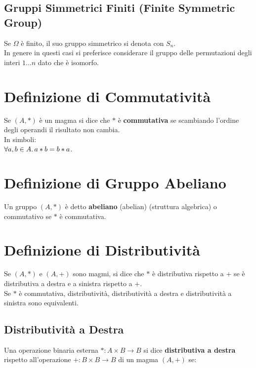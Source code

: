 \documentclass[a4paper, twoside, italian, 11pt]{book}
\begin{document}
\subsection{Gruppi Simmetrici Finiti (Finite Symmetric Group)}

Se $\Omega$ è finito, il suo gruppo simmetrico si denota con $S_n$. \\
In genere in questi casi si preferisce considerare il gruppo delle permutazioni degli interi $1...n$ dato che è isomorfo.



\section{Definizione di Commutatività}

Se $(A, *)$ è un magma si dice che $*$ è \textbf{commutativa} se scambiando l'ordine degli operandi il risultato non cambia. \\

\noindent
In simboli: \\

$\forall a,b \in A \ldotp a * b = b * a$.



\section{Definizione di Gruppo Abeliano}

Un gruppo $(A, *)$ è detto \textbf{abeliano} (abelian) (struttura algebrica) o commutativo se $*$ è commutativa.



\section{Definizione di Distributività}

Se $(A, *)$ e $(A, +)$ sono magmi, si dice che $*$ è distributiva rispetto a $+$ se è distributiva a destra e a sinistra rispetto a $+$. \\

\noindent
Se $*$ è commutativa, distributività, distributività a destra e distributività a sinistra sono equivalenti.


\subsection{Distributività a Destra}

Una operazione binaria esterna $* : A \times B \rightarrow B$ si dice \textbf{distributiva a destra} rispetto all'operazione $+ : B \times B \rightarrow B$ di un magma $(A, +)$ se: \\
\end{document}

